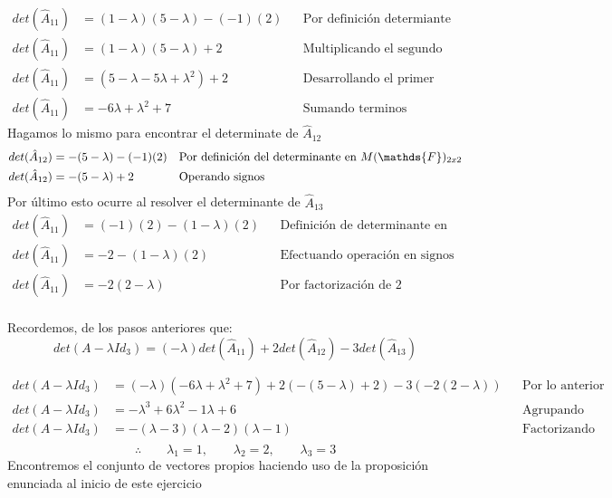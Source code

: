 \documentclass[letterpaper]{article}
\newcommand{\F}{\mathds{F}}
\renewcommand{\*}{\cdot}
\theoremstyle{definition}
\begin{document}
\begin{align*}
	det(\hat{A}_{11}) & = (1-\lambda)(5-\lambda) - (-1)(2) && \text{Por definición determiante de 2x2}\\
	det(\hat{A}_{11}) & = (1-\lambda)(5-\lambda) +2 && \text{Multiplicando el segundo sumando}\\
	det(\hat{A}_{11}) & = (5 -\lambda -5\lambda +\lambda^2) +2 && \text{Desarrollando el primer sumando}\\	
	det(\hat{A}_{11}) & = -6\lambda +\lambda^2 +7 && \text{Sumando terminos semejantes}	
\end{align*}
Hagamos lo mismo para encontrar el determinate de $ \hat{A}_{12} $
\begin{align*}
	det(\hat{A}_{12}) &= -(5 - \lambda)- (-1)(2) && \text{Por definición del determinante en $ M(\F)_{2x2} $}\\
	det(\hat{A}_{12}) &= -(5 - \lambda)+2 && \text{Operando signos}\\
\end{align*}
Por último esto ocurre al resolver el determinante de $ \hat{A}_{13} $
\begin{align*}
	det(\hat{A}_{11}) &= (-1)(2)- (1-\lambda)(2) && \text{Definición de determinante en 2x2}\\
	det(\hat{A}_{11}) &= -2 - (1-\lambda)(2) && \text{Efectuando operación en signos}\\
	det(\hat{A}_{11}) &= -2(2-\lambda) && \text{Por factorización de 2}\\
\end{align*}
\begin{center}
	Recordemos, de los pasos anteriores que: $$det(A - \lambda Id_3) = (-\lambda) det(\hat{A}_{11}) + 2det(\hat{A}_{12}) - 3det(\hat{A}_{13})  $$
\end{center}
\begin{align*}
	det(A - \lambda Id_3) &= (-\lambda) (-6\lambda +\lambda^2 +7) + 2(-(5 - \lambda)+2) - 3(-2(2-\lambda)) && \text{Por lo anterior}\\
	det(A - \lambda Id_3) &= -\lambda^3 + 6\lambda^2 - 1\lambda + 6&& \text{Agrupando términos semejantes}\\
	det(A - \lambda Id_3) &= -(\lambda-3)(\lambda -2)(\lambda -1)&& \text{Factorizando adecuadamente}\\
\end{align*}
\[ \therefore \qquad \lambda_{1} = 1, \qquad \lambda_{2} = 2, \qquad \lambda_{3} = 3 \]
Encontremos el conjunto de vectores propios haciendo uso de la proposición enunciada al inicio de este ejercicio
\end{document}
